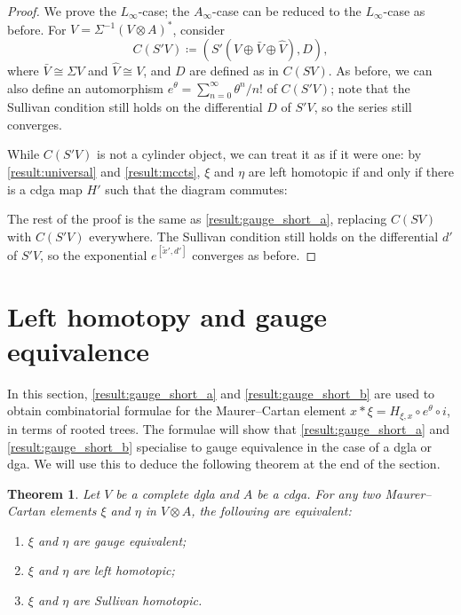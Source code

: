 \documentclass[a4paper,reqno]{amsart}
\theoremstyle{plain}
\newtheorem{thm}{Theorem}[section]
\theoremstyle{definition}
\theoremstyle{remark}
\begin{document}
\begin{proof}
  We prove the $L_{\infty}$-case; the $A_{\infty}$-case can be reduced to the $L_\infty$-case as before.
  For $V = \Sigma^{-1}(V \otimes A)^*$, consider 
  \[
    C(S'V) \coloneqq (S'(V \oplus \bar{V} \oplus \widehat{V}), D),
  \]
  where $\bar{V} \cong \Sigma V$ and $\widehat{V} \cong V$, and $D$ are defined as in $C(SV)$. 
  As before, we can also define an automorphism $e^{\theta} = \sum_{n=0}^{\infty} \theta^n / n!$ of $C(S'V)$; note that the Sullivan condition still holds on the differential $D$ of $S'V$, so the series still converges.

  While $C(S'V)$ is not a cylinder object, we can treat it as if it were one: 
  by \cref{result:universal} and \cref{result:mccts}, $\xi$ and $\eta$ are left homotopic if and only if there is a cdga map $H'$ such that the diagram commutes:
  \begin{center}
  \end{center} 
  The rest of the proof is the same as \cref{result:gauge_short_a}, replacing $C(SV)$ with $C(S'V)$ everywhere. The Sullivan condition still holds on the differential $d'$ of $S'V$, so the exponential $e^{[\tilde{x}',d']}$ converges as before. 
\end{proof}


\section{Left homotopy and gauge equivalence}
\label{gauge_formulae}

In this section, \cref{result:gauge_short_a} and \cref{result:gauge_short_b} are used to obtain combinatorial formulae for the Maurer--Cartan element $x * \xi = H_{\xi,x} \circ e^{\theta} \circ i$, in terms of rooted trees. 
The formulae will show that \cref{result:gauge_short_a} and \cref{result:gauge_short_b} specialise to gauge equivalence in the case of a dgla or dga.
We will use this to deduce the following theorem at the end of the section.

\begin{thm}
  \label{thesame}
  Let\/ $V$ be a complete dgla and\/ $A$ be a cdga. For any two Maurer--Cartan elements\/ $\xi$ and $\eta$ in $V \otimes A$, the following are equivalent:
  \begin{enumerate}
    \item\label{gaugeeq} $\xi$ and $\eta$ are gauge equivalent; 
    \item\label{lefthtp} $\xi$ and $\eta$ are left homotopic;
    \item\label{sullivanhtp} $\xi$ and $\eta$ are Sullivan homotopic.
  \end{enumerate}
\end{thm}
\end{document}
